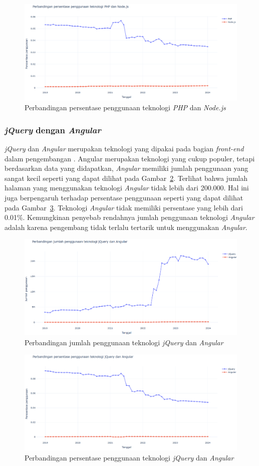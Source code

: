 \begin{figure}[H]
    \centering
    \includegraphics[width=0.7\linewidth]{Gambar/Perbandinganpersentasephpnode.png}
    \caption{Perbandingan persentase penggunaan teknologi \textit{PHP} dan \textit{Node.js}}
    \label{fig:phpnodepersen}
\end{figure}

\subsubsection{\textit{jQuery} dengan \textit{Angular}}
\label{subsubsec:angularjq}

\textit{jQuery} dan \textit{Angular} merupakan teknologi yang dipakai pada bagian \textit{front-end} dalam pengembangan \web. Angular merupakan teknologi yang cukup populer, tetapi berdasarkan data yang didapatkan, \textit{Angular} memiliki jumlah penggunaan yang sangat kecil seperti yang dapat dilihat pada Gambar~\ref{fig:angularjq}. Terlihat bahwa jumlah halaman \web yang menggunakan teknologi \textit{Angular} tidak lebih dari 200.000. Hal ini juga berpengaruh terhadap persentase penggunaan seperti yang dapat dilihat pada Gambar~\ref{fig:angularjqpersen}. Teknologi \textit{Angular} tidak memiliki persentase yang lebih dari 0.01\%. Kemungkinan penyebab rendahnya jumlah penggunaan teknologi \textit{Angular} adalah karena pengembang tidak terlalu tertarik untuk menggunakan \textit{Angular}.

\begin{figure}[H]
    \centering
    \includegraphics[width=0.7\linewidth]{Gambar/perbandinganangularjq.png}
    \caption{Perbandingan jumlah penggunaan teknologi \textit{jQuery} dan \textit{Angular}}
    \label{fig:angularjq}
\end{figure}

\begin{figure}[H]
    \centering
    \includegraphics[width=0.7\linewidth]{Gambar/angularjqpersen.png}
    \caption{Perbandingan persentase penggunaan teknologi \textit{jQuery} dan \textit{Angular}}
    \label{fig:angularjqpersen}
\end{figure}